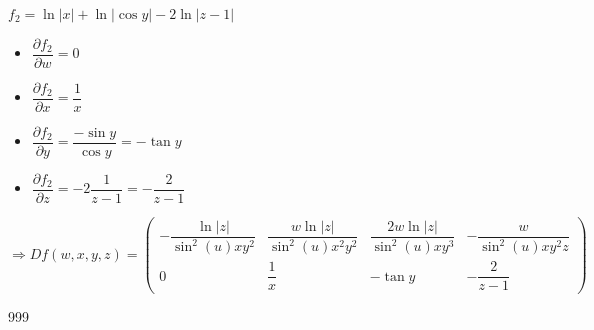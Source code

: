 \documentclass[a4paper]{article}
\begin{document}
$ f_2=\ln |x|+\ln |\cos y|-2\ln |z-1| $\\

\begin{itemize}

\item $ \dfrac{\partial f_2}{\partial w}=0 $\\

\item $ \dfrac{\partial f_2}{\partial x}=\dfrac{1}{x} $\\

\item $ \dfrac{\partial f_2}{\partial y}=\dfrac{-\sin y}{\cos y}=-\tan y $\\

\item $ \dfrac{\partial f_2}{\partial z}=-2\dfrac{1}{z-1}=-\dfrac{2}{z-1} $\\

\end{itemize}

$ \Rightarrow Df(w,x,y,z)=\left(\begin{array}{cccc}-\dfrac{\ln |z|}{\sin^2(u)xy^2}&\dfrac{w \ln |z|}{\sin^2(u)x^2y^2}&\dfrac{2w \ln |z|}{\sin^2(u)xy^3}&-\dfrac{w}{\sin^2(u)xy^2z}\\ 0&\dfrac{1}{x}&-\tan y&-\dfrac{2}{z-1}\end{array}\right) $\\


\begin{thebibliography}{999}
\end{thebibliography}
\end{document}
